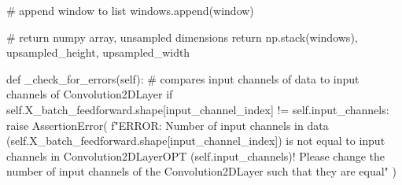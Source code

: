 \documentclass[%
oneside,                 %
final,                   %
10pt]{article}
\begin{document}
                    # append window to list
                    windows.append(window)

            # return numpy array, unsampled dimensions
            return np.stack(windows), upsampled_height, upsampled_width

    def _check_for_errors(self):
        # compares input channels of data to input channels of Convolution2DLayer
        if self.X_batch_feedforward.shape[input_channel_index] != self.input_channels:
            raise AssertionError(
                f"ERROR: Number of input channels in data ({self.X_batch_feedforward.shape[input_channel_index]}) is not equal to input channels in Convolution2DLayerOPT ({self.input_channels})! Please change the number of input channels of the Convolution2DLayer such that they are equal"
            )

\epycod
\end{document}
